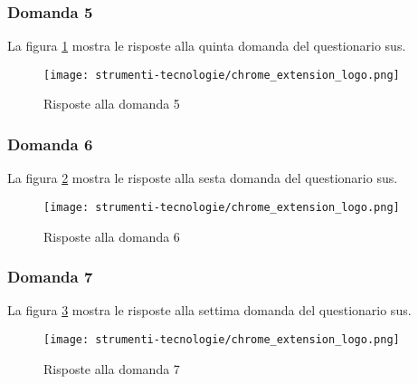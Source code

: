 \subsubsection*{Domanda 5}

\vspace{5pt}
\begin{minipage}{\textwidth}
  \par\noindent La figura \ref{fig:sus_q5} mostra le risposte alla quinta domanda del questionario \gls{sus}.
  \begin{figure}[H]
    \centering
    \texttt{[image: strumenti-tecnologie/chrome\_extension\_logo.png]} 
    \caption{Risposte alla domanda 5}
    \label{fig:sus_q5}
  \end{figure}
\end{minipage}

\subsubsection*{Domanda 6}

\vspace{5pt}
\begin{minipage}{\textwidth}
  \par\noindent La figura \ref{fig:sus_q6} mostra le risposte alla sesta domanda del questionario \gls{sus}.
  \begin{figure}[H]
    \centering
    \texttt{[image: strumenti-tecnologie/chrome\_extension\_logo.png]} 
    \caption{Risposte alla domanda 6}
    \label{fig:sus_q6}
  \end{figure}
\end{minipage}

\subsubsection*{Domanda 7}

\vspace{5pt}
\begin{minipage}{\textwidth}
  \par\noindent La figura \ref{fig:sus_q7} mostra le risposte alla settima domanda del questionario \gls{sus}.
  \begin{figure}[H]
    \centering
    \texttt{[image: strumenti-tecnologie/chrome\_extension\_logo.png]} 
    \caption{Risposte alla domanda 7}
    \label{fig:sus_q7}
  \end{figure}
\end{minipage}

